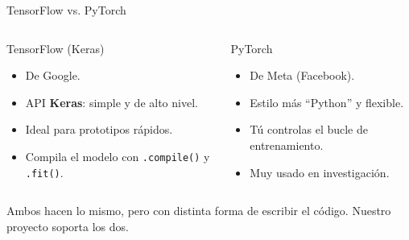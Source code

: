 \documentclass[10pt,aspectratio=169]{beamer}
\begin{document}
\begin{frame}{TensorFlow vs. PyTorch}
  \begin{columns}
    \begin{block}{TensorFlow (Keras)}
      \begin{itemize}
        \item De Google.
        \item API \textbf{Keras}: simple y de alto nivel.
        \item Ideal para prototipos rápidos.
        \item Compila el modelo con \texttt{.compile()} y \texttt{.fit()}.
      \end{itemize}
    \end{block}

    \begin{block}{PyTorch}
      \begin{itemize}
        \item De Meta (Facebook).
        \item Estilo más ``Python'' y flexible.
        \item Tú controlas el bucle de entrenamiento.
        \item Muy usado en investigación.
      \end{itemize}
    \end{block}
  \end{columns}

  \pause
  \begin{center}
    \small Ambos hacen lo mismo, pero con distinta forma de escribir el código.
    Nuestro proyecto soporta los dos.
  \end{center}
\end{frame}
\end{document}
